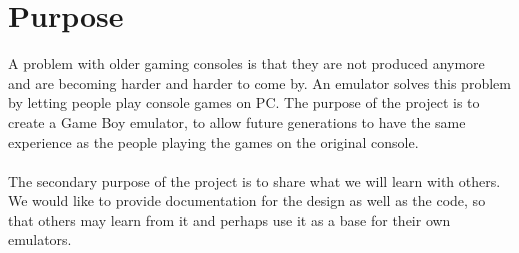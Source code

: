 \chapter{Purpose}





A problem with older gaming consoles is that they are not produced anymore and are becoming harder and harder to come by. An emulator solves this problem by letting people play console games on PC. The purpose of the project is to create a Game Boy emulator, to allow future generations to have the same experience as the people playing the games on the original console.
\\\\
The secondary purpose of the project is to share what we will learn with others. We would like to provide documentation for the design as well as the code, so that others may learn from it and perhaps use it as a base for their own emulators.

